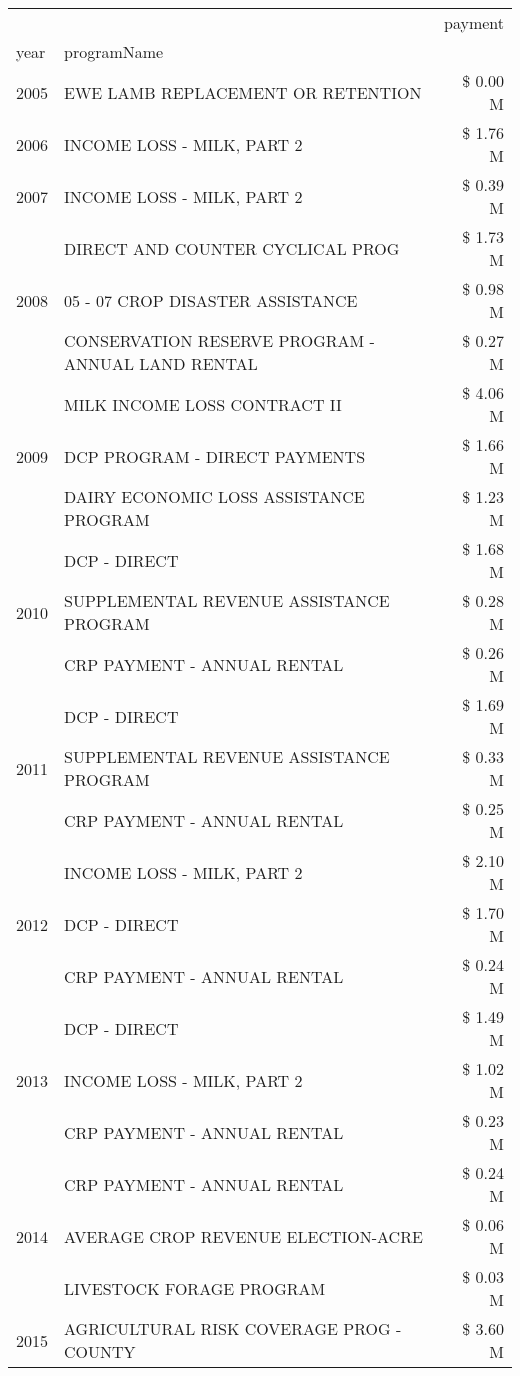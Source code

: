 \begin{tabular}{llr}
\toprule
 &  & payment \\
year & programName &  \\
\midrule
2005 & EWE LAMB REPLACEMENT OR RETENTION & \$ 0.00 M \\
\cline{1-3}
2006 & INCOME LOSS - MILK, PART 2 & \$ 1.76 M \\
\cline{1-3}
2007 & INCOME LOSS - MILK, PART 2 & \$ 0.39 M \\
\cline{1-3}
\multirow[t]{3}{*}{2008} & DIRECT AND COUNTER CYCLICAL PROG & \$ 1.73 M \\
 & 05 - 07 CROP DISASTER ASSISTANCE & \$ 0.98 M \\
 & CONSERVATION RESERVE PROGRAM - ANNUAL LAND RENTAL & \$ 0.27 M \\
\cline{1-3}
\multirow[t]{3}{*}{2009} & MILK INCOME LOSS CONTRACT II & \$ 4.06 M \\
 & DCP PROGRAM - DIRECT PAYMENTS & \$ 1.66 M \\
 & DAIRY ECONOMIC LOSS ASSISTANCE PROGRAM & \$ 1.23 M \\
\cline{1-3}
\multirow[t]{3}{*}{2010} & DCP - DIRECT & \$ 1.68 M \\
 & SUPPLEMENTAL REVENUE ASSISTANCE PROGRAM & \$ 0.28 M \\
 & CRP PAYMENT - ANNUAL RENTAL & \$ 0.26 M \\
\cline{1-3}
\multirow[t]{3}{*}{2011} & DCP - DIRECT & \$ 1.69 M \\
 & SUPPLEMENTAL REVENUE ASSISTANCE PROGRAM & \$ 0.33 M \\
 & CRP PAYMENT - ANNUAL RENTAL & \$ 0.25 M \\
\cline{1-3}
\multirow[t]{3}{*}{2012} & INCOME LOSS - MILK, PART 2 & \$ 2.10 M \\
 & DCP - DIRECT & \$ 1.70 M \\
 & CRP PAYMENT - ANNUAL RENTAL & \$ 0.24 M \\
\cline{1-3}
\multirow[t]{3}{*}{2013} & DCP - DIRECT & \$ 1.49 M \\
 & INCOME LOSS - MILK, PART 2 & \$ 1.02 M \\
 & CRP PAYMENT - ANNUAL RENTAL & \$ 0.23 M \\
\cline{1-3}
\multirow[t]{3}{*}{2014} & CRP PAYMENT - ANNUAL RENTAL & \$ 0.24 M \\
 & AVERAGE CROP REVENUE ELECTION-ACRE & \$ 0.06 M \\
 & LIVESTOCK FORAGE PROGRAM & \$ 0.03 M \\
\cline{1-3}
\multirow[t]{3}{*}{2015} & AGRICULTURAL RISK COVERAGE PROG - COUNTY & \$ 3.60 M \\

\end{tabular}
